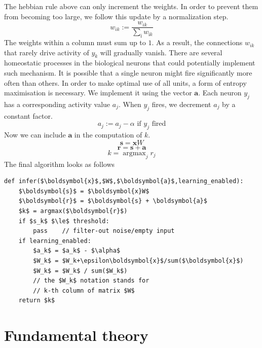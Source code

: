 \documentclass[12pt]{article}
\DeclareMathOperator*{\argmax}{argmax}
\begin{document}
The hebbian rule above can only increment the weights. In order to prevent them from becoming too large, we follow this update by a normalization step.
\[
w_{ik} := \frac{w_{ik}}{ \sum_{ï} w_{ïk}} 
\]
The weights within a column must sum up to $1$. As a result, the connections $w_{ik}$ that rarely drive activity of $y_k$ will gradually vanish. There are several homeostatic processes in the biological neurons that could potentially implement such mechanism.  
It is possible that a single neuron might fire significantly more often than others. In order to make optimal use of all units, a form of entropy maximisation is necessary. We implement it using the vector $\boldsymbol{a}$. Each neuron $y_j$ has a corresponding activity value $a_j$.
When $y_j$ fires, we decrement $a_j$ by a constant factor.
\[
a_j := a_j - \alpha \text{ if } y_j \text{ fired}
\]
Now we can include $\boldsymbol{a}$ in the computation of $k$.
\[\boldsymbol{s} = \boldsymbol{x}W \]
\[\boldsymbol{r} = \boldsymbol{s}+ \boldsymbol{a} \]
\[k = \argmax_j r_j \]
The final algorithm looks as follows
\begin{lstlisting}
def infer($\boldsymbol{x}$,$W$,$\boldsymbol{a}$,learning_enabled):
    $\boldsymbol{s}$ = $\boldsymbol{x}W$
    $\boldsymbol{r}$ = $\boldsymbol{s} + \boldsymbol{a}$
    $k$ = argmax($\boldsymbol{r}$)
    if $s_k$ $\le$ threshold:
        pass    // filter-out noise/empty input
    if learning_enabled:
        $a_k$ = $a_k$ - $\alpha$
        $W_k$ = $W_k+\epsilon\boldsymbol{x}$/sum($\boldsymbol{x}$)
        $W_k$ = $W_k$ / sum($W_k$)
        // the $W_k$ notation stands for 
        // k-th column of matrix $W$
    return $k$
\end{lstlisting}

\section{Fundamental theory}
\end{document}
